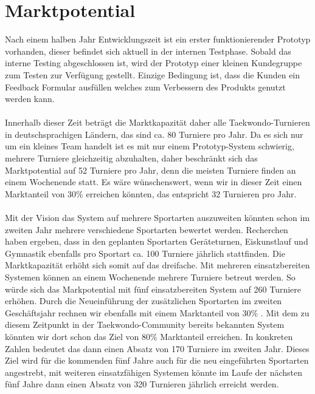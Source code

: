 \section{Marktpotential}\label{marktpotential}

Nach einem halben Jahr Entwicklungszeit ist ein erster funktionierender Prototyp vorhanden, dieser befindet sich aktuell in
der internen Testphase.
Sobald das interne Testing abgeschlossen ist, wird der Prototyp einer kleinen Kundegruppe zum Testen zur Verfügung gestellt.
Einzige Bedingung ist, dass die Kunden ein Feedback Formular ausfüllen welches zum Verbessern des Produkts genutzt
werden kann.
\\\\


Innerhalb dieser Zeit beträgt die Marktkapazität daher alle Taekwondo-Turnieren in deutschsprachigen Ländern, das
sind ca. 80 Turniere pro Jahr.
Da es sich nur um ein kleines Team handelt ist es mit nur einem Prototyp-System schwierig, mehrere Turniere
	gleichzeitig abzuhalten, daher beschränkt sich das Marktpotential auf 52 Turniere pro Jahr, denn die meisten
	Turniere finden an einem Wochenende statt.
Es wäre wünschenswert, wenn wir in dieser Zeit einen Marktanteil von 30\% erreichen könnten, das entspricht 32
	Turnieren pro Jahr.
\\\\
Mit der Vision das System auf mehrere Sportarten auszuweiten könnten schon im zweiten Jahr mehrere verschiedene
	Sportarten bewertet werden.
Recherchen haben ergeben, dass in den geplanten Sportarten Geräteturnen, Eiskunstlauf und Gymnastik ebenfalls pro
	Sportart ca. 100 Turniere jährlich stattfinden.
Die Marktkapazität erhöht sich somit auf das dreifache.
Mit mehreren einsatzbereiten Systemen können an einem Wochenende mehrere Turniere betreut werden.
So würde sich das Markpotential mit fünf einsatzbereiten System auf 260 Turniere erhöhen.
Durch die Neueinführung der zusätzlichen Sportarten im zweiten Geschäftsjahr rechnen wir ebenfalls mit einem
	Marktanteil von 30\% .
Mit dem zu diesem Zeitpunkt in der Taekwondo-Community bereits bekannten System könnten wir dort schon das Ziel von
	80\% Marktanteil erreichen.
In konkreten Zahlen bedeutet das dann einen Absatz von 170 Turniere im zweiten Jahr.
Dieses Ziel wird für die kommenden fünf Jahre auch für die neu eingeführten Sportarten angestrebt, mit weiteren
	einsatzfähigen Systemen könnte im Laufe der nächsten fünf Jahre dann einen Absatz von 320 Turnieren jährlich
	erreicht werden.

